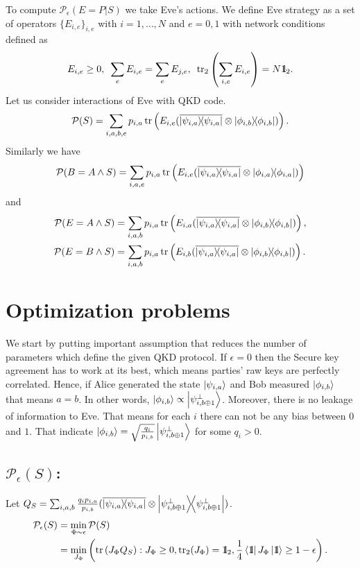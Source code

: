 \documentclass[12pt,a4paper,reqno, aps, superscriptaddress]{amsart}
\newcommand{\Id}{{\rm 1\hspace{-0.9mm}l}}
\newcommand{\PP}{\ensuremath{\mathcal{P}}}
\newcommand{\proj}[1]{\ensuremath{\ketbra{#1}{#1}}}
\begin{document}
To compute $\PP_\epsilon(E=P|S)$ we take Eve's actions. We define Eve strategy 
as a set of operators $\{ E_{i,e}\}_{i,e}$ with $i=1,\ldots,N$ and $e=0,1$ with 
network conditions defined as 
\begin{equation}
    E_{i,e} \ge 0, \,\,\, \sum_{e} E_{i,e} = \sum_{e} E_{j,e}, \,\,\, 
    \tr_{2} \left( \sum_{i,e} E_{i,e}   \right) = N \Id_2 .
\end{equation} 
Let us consider interactions of Eve with QKD code.
\begin{equation}
    \PP(S) = \sum_{i,a,b,e} p_{i,a} \tr\left(E_{i,e} 
    (\overline{\proj{\psi_{i,a}}} 
\otimes 
\proj{\phi_{i,b}})\right).
\end{equation}
Similarly we have
\begin{equation}
\PP(B=A \wedge S) = \sum_{i,a,e} p_{i,a} \tr\left(E_{i,e}
(\overline{\proj{\psi_{i,a}}} 
\otimes 
\proj{\phi_{i,a}})\right)
\end{equation}
and
\begin{equation}
\begin{split}
\PP(E=A \wedge S) &= \sum_{i,a,b} p_{i,a} \tr\left(E_{i,a} 
    (\overline{\proj{\psi_{i,a}}} 
\otimes 
\proj{\phi_{i,b}})\right),\\
\PP(E=B \wedge S) &= \sum_{i,a,b} p_{i,a} \tr\left(E_{i,b} 
    (\overline{\proj{\psi_{i,a}}} 
\otimes 
\proj{\phi_{i,b}})\right).
\end{split}
\end{equation}

\section{Optimization problems}
We start by putting important assumption that reduces the number of parameters 
which define the given QKD protocol. If $\epsilon=0$ then the Secure key 
agreement has to work at its best, which means parties' raw keys are perfectly 
correlated. Hence, if Alice 
generated the state $\ket{\psi_{i,a}}$ and Bob measured $\ket{\phi_{i,b}}$ that 
means $a=b$. 
In other words, $\ket{\phi_{i,b}} \propto \ket{\psi_{i,b\oplus 1}^\perp}$. 
Moreover, there is no leakage of information to Eve. That means for each $i$ 
there can not be any bias between $0$ and $1$. That indicate $\ket{\phi_{i,b}} 
= \sqrt{\frac{q_i}{p_{i,b}}}\ket{\psi_{i,b\oplus 1}^\perp}$ for some $q_i > 0$.
\subsection{$\PP_\epsilon(S)$:}
Let $Q_S = \sum_{i,a,b} \frac{q_i 
p_{i,a}}{p_{i,b}}(\overline{\proj{\psi_{i,a}}} 
\otimes \proj{\psi_{i,b\oplus 1}^\perp})$.
\begin{equation}
\begin{split}
\PP_\epsilon(S) &= \min_{\Phi \sim \epsilon} \PP(S)\\
&=\min_{J_\Phi} \left( \tr\left(J_\Phi Q_S\right): J_\Phi \ge 0, \tr_2(J_\Phi) 
= \Id_2,
\frac14 \bra{\Id} J_\Phi \ket{\Id} \ge 1-\epsilon \right).
\end{split}
\end{equation}
\end{document}
